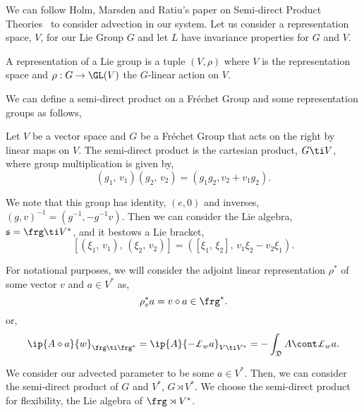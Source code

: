 \noindent
We can follow Holm, Marsden and Ratiu's paper on Semi-direct Product Theories~\cite{holm1998eulerpoincare} to consider advection in our system. Let us consider a representation space, $V$, for our Lie Group $G$ and let $L$ have invariance properties for $G$ and $V$.
\begin{ndefi}[Representation]
  A representation of a Lie group is a tuple $(V, \rho)$ where $V$ is the representation space and $\rho : G \to \GL(V)$ the $G$-linear action on $V$.
\end{ndefi}
\noindent
We can define a semi-direct product on a Fr\'echet Group and some representation groups as follows,
\begin{ndefi}
  Let $V$ be a vector space and $G$ be a Fr\'echet Group that acts on the right by linear maps on $V$. The semi-direct product is the cartesian product, $G \ti V$, where group multiplication is given by,
  $$ (g_1,\, v_1)(g_2,\, v_2) = (g_1g_2, v_2 + v_1g_2). $$
\end{ndefi}
\noindent
We note that this group has identity, $(e, 0)$ and inverses, $(g, v)^{-1} = (g^{-1}, -g^{-1}v)$. Then we can consider the Lie algebra, $\mathfrak{s} = \frg \ti V^*$, and it bestows a Lie bracket,
$$ [(\xi_1,\, v_1),\, (\xi_2,\, v_2)] = ([\xi_1,\,\xi_2],\, v_1\xi_2 - v_2\xi_1). $$
\begin{notation}
   For notational purposes, we will consider the adjoint linear representation $\rho^*$ of some vector $v$ and $a \in V^*$ as,
   $$ \rho^*_v a = v \diamond a \in \frg^*. $$
   or,
   $$ \ip{A \diamond a}{w}_{\frg \ti \frg^*} = \ip{A}{-\pounds_w a}_{V\ti V^*} = -\int_\mathfrak{D} A \cont \pounds_w a.  $$
\end{notation}

\noindent
We consider our advected parameter to be some $a \in V^*$. Then, we can consider the semi-direct product of $G$ and $V^*$, $G \rtimes V^*$. We choose the semi-direct product for flexibility, the Lie algebra of $\frg \rtimes V^*$. \\

